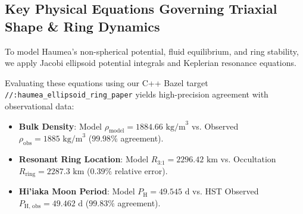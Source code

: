 \documentclass[11pt,a4paper]{article}
\begin{document}
\vspace{-0.5em}
\subsection*{Key Physical Equations Governing Triaxial Shape \& Ring Dynamics}
To model Haumea's non-spherical potential, fluid equilibrium, and ring stability, we apply Jacobi ellipsoid potential integrals and Keplerian resonance equations.

\begin{table}[H]
\centering
\caption{\textbf{Core Mathematical Formulas for the Haumea System}}
\end{table}

Evaluating these equations using our C++ Bazel target \texttt{//:haumea\_ellipsoid\_ring\_paper} yields high-precision agreement with observational data:
\begin{itemize}
    \item \textbf{Bulk Density}: Model $\rho_{\text{model}} = 1884.66\text{ kg/m}^3$ vs. Observed $\rho_{\text{obs}} = 1885\text{ kg/m}^3$ ($99.98\%$ agreement).
    \item \textbf{Resonant Ring Location}: Model $R_{\text{3:1}} = 2296.42\text{ km}$ vs. Occultation $R_{\text{ring}} = 2287.3\text{ km}$ ($0.39\%$ relative error).
    \item \textbf{Hi'iaka Moon Period}: Model $P_{\text{H}} = 49.545\text{ d}$ vs. HST Observed $P_{\text{H, obs}} = 49.462\text{ d}$ ($99.83\%$ agreement).
\end{itemize}
\end{document}
